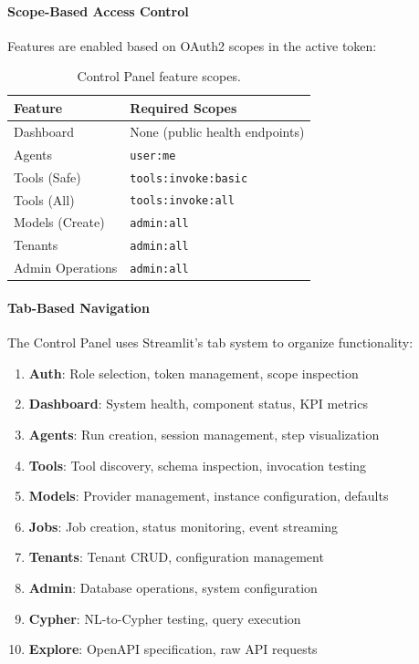 \paragraph{Scope-Based Access Control}
Features are enabled based on OAuth2 scopes in the active token:

\begin{table}[htbp]
    \centering
    \caption{Control Panel feature scopes.}
    \label{tab:control-panel-scopes}
    \small
    \begin{tabular}{ll}
        \toprule
        \textbf{Feature} & \textbf{Required Scopes} \\
        \midrule
        Dashboard & None (public health endpoints) \\
        Agents & \texttt{user:me} \\
        Tools (Safe) & \texttt{tools:invoke:basic} \\
        Tools (All) & \texttt{tools:invoke:all} \\
        Models (Create) & \texttt{admin:all} \\
        Tenants & \texttt{admin:all} \\
        Admin Operations & \texttt{admin:all} \\
        \bottomrule
    \end{tabular}
\end{table}

\paragraph{Tab-Based Navigation}
The Control Panel uses Streamlit's tab system to organize functionality:

\begin{enumerate}
    \item \textbf{Auth}: Role selection, token management, scope inspection
    \item \textbf{Dashboard}: System health, component status, KPI metrics
    \item \textbf{Agents}: Run creation, session management, step visualization
    \item \textbf{Tools}: Tool discovery, schema inspection, invocation testing
    \item \textbf{Models}: Provider management, instance configuration, defaults
    \item \textbf{Jobs}: Job creation, status monitoring, event streaming
    \item \textbf{Tenants}: Tenant CRUD, configuration management
    \item \textbf{Admin}: Database operations, system configuration
    \item \textbf{Cypher}: NL-to-Cypher testing, query execution
    \item \textbf{Explore}: OpenAPI specification, raw API requests
\end{enumerate}

